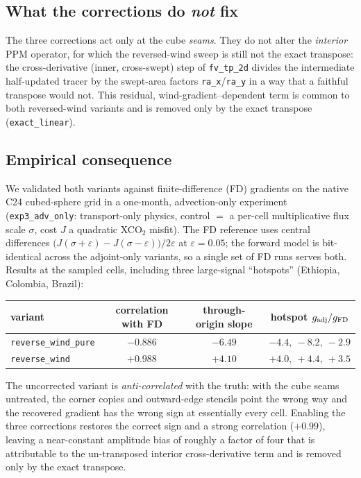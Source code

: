 \documentclass[11pt]{article}
\newcommand{\code}[1]{\texttt{#1}}
\begin{document}
\subsection{What the corrections do \emph{not} fix}

The three corrections act only at the cube \emph{seams}. They do not alter the
\emph{interior} PPM operator, for which the reversed-wind sweep is still not the
exact transpose: the cross-derivative (inner, cross-swept) step of
\code{fv\_tp\_2d} divides the intermediate half-updated tracer by the swept-area
factors \code{ra\_x}/\code{ra\_y} in a way that a faithful transpose would not.
This residual, wind-gradient--dependent term is common to both reversed-wind
variants and is removed only by the exact transpose (\code{exact\_linear}).

\subsection{Empirical consequence}

We validated both variants against finite-difference (FD) gradients on the
native C24 cubed-sphere grid in a one-month, advection-only experiment
(\code{exp3\_adv\_only}: transport-only physics, control $=$ a per-cell
multiplicative flux scale $\sigma$, cost $J$ a quadratic XCO$_2$ misfit). The FD
reference uses central differences $\big(J(\sigma{+}\varepsilon)-J(\sigma{-}
\varepsilon)\big)/2\varepsilon$ at $\varepsilon=0.05$; the forward model is
bit-identical across the adjoint-only variants, so a single set of FD runs
serves both. Results at the sampled cells, including three large-signal
``hotspots'' (Ethiopia, Colombia, Brazil):

\begin{center}
\begin{tabular}{lccc}
\toprule
variant & correlation with FD & through-origin slope & hotspot $g_{\rm adj}/g_{\rm FD}$ \\
\midrule
\code{reverse\_wind\_pure} & $-0.886$ & $-6.49$ & $-4.4,\ -8.2,\ -2.9$ \\
\code{reverse\_wind}       & $+0.988$ & $+4.10$ & $+4.0,\ +4.4,\ +3.5$ \\
\bottomrule
\end{tabular}
\end{center}

The uncorrected variant is \emph{anti-correlated} with the truth: with the cube
seams untreated, the corner copies and outward-edge stencils point the wrong way
and the recovered gradient has the wrong sign at essentially every cell. Enabling
the three corrections restores the correct sign and a strong correlation
($+0.99$), leaving a near-constant amplitude bias of roughly a factor of four
that is attributable to the un-transposed interior cross-derivative term and is
removed only by the exact transpose.
\end{document}
